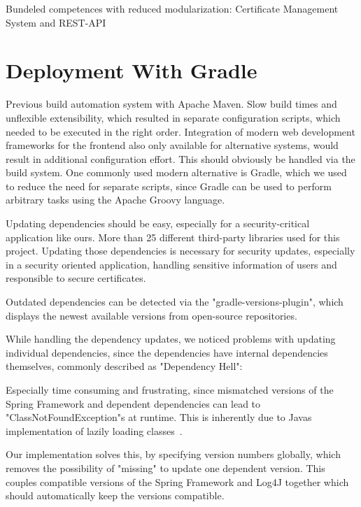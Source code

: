Bundeled competences with reduced modularization: Certificate Management System and REST-API

\section{Deployment With Gradle}\label{sec:deploymentWithGradle}

Previous build automation system with Apache Maven.
Slow build times and unflexible extensibility, which resulted in separate configuration scripts, which needed to be
executed in the right order.
Integration of modern web development frameworks for the frontend also only available for alternative systems, would
result in additional configuration effort.
This should obviously be handled via the build system.
One commonly used modern alternative is Gradle, which we used to reduce the need for separate scripts, since Gradle can
be used to perform arbitrary tasks using the Apache Groovy language.

Updating dependencies should be easy, especially for a security-critical application like ours.
More than 25 different third-party libraries used for this project.
Updating those dependencies is necessary for security updates, especially in a security oriented application, handling
sensitive information of users and responsible to secure certificates.

Outdated dependencies can be detected via the "gradle-versions-plugin", which displays the newest available versions
from open-source repositories. %

While handling the dependency updates, we noticed problems with updating individual dependencies, since the dependencies
have internal dependencies themselves, commonly described as "Dependency Hell": %

Especially time consuming and frustrating, since mismatched versions of the Spring Framework and dependent dependencies
can lead to "ClassNotFoundException"s at runtime.
This is inherently due to Javas implementation of lazily loading classes~\cite{gosling2014java}.

Our implementation solves this, by specifying version numbers globally, which removes the possibility of "missing" to
update one dependent version.
This couples compatible versions of the Spring Framework and Log4J together which should automatically keep the versions
compatible.

